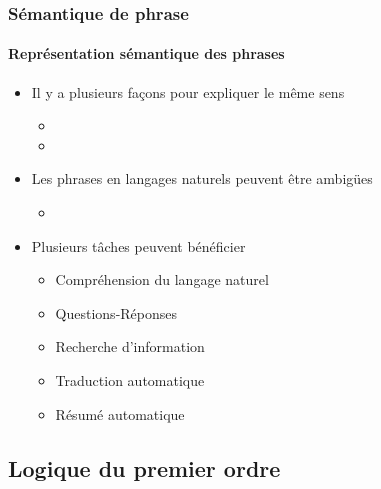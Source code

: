 \documentclass[xcolor=table]{beamer}
\begin{document}
\begin{frame}
	\frametitle{Sémantique de phrase}
	\framesubtitle{Représentation sémantique des phrases}
	
	\begin{itemize}
		\item Il y a plusieurs façons pour expliquer le même sens
		\begin{itemize}
			\item {}
			\item {}
		\end{itemize}
	
		\item Les phrases en langages naturels peuvent être ambigües
		\begin{itemize}
			\item {}
		\end{itemize}
	
		\item Plusieurs tâches peuvent bénéficier 
		\begin{itemize}
			\item Compréhension du langage naturel
			\item Questions-Réponses
			\item Recherche d'information
			\item Traduction automatique
			\item Résumé automatique
		\end{itemize}
	\end{itemize}
	
\end{frame}

\subsection{Logique du premier ordre}
\end{document}
